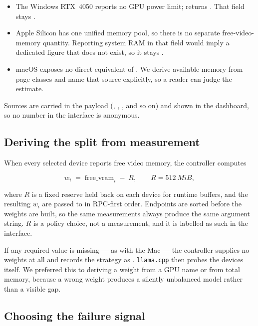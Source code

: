 \begin{itemize}[leftmargin=1.4em,itemsep=2pt]
  \item The Windows RTX~4050 reports no GPU power limit; 
        returns \code{[N/A]}. That field stays .
  \item Apple Silicon has one unified memory pool, so there is no separate
        free-video-memory quantity. Reporting system RAM in that field would
        imply a dedicated figure that does not exist, so it stays .
  \item macOS exposes no direct equivalent of . We derive
        available memory from  page classes and name that source
        explicitly, so a reader can judge the estimate.
\end{itemize}

Sources are carried in the payload (, ,
, and so on) and shown in the dashboard, so no
number in the interface is anonymous.

\subsection{Deriving the split from measurement}

When every selected device reports free video memory, the controller computes

\[
w_i \;=\; \mathrm{free\_vram}_i \;-\; R, \qquad R = \SI{512}{MiB},
\]

where $R$ is a fixed reserve held back on each device for runtime buffers, and
the resulting $w_i$ are passed to  in RPC-first order.
Endpoints are sorted before the weights are built, so the same measurements
always produce the same argument string. $R$ is a policy choice, not a
measurement, and it is labelled as such in the interface.

If any required value is missing --- as with the Mac --- the controller supplies
no weights at all and records the strategy as
. \texttt{llama.cpp} then
probes the devices itself. We preferred this to deriving a weight from a GPU
name or from total memory, because a wrong weight produces a silently
unbalanced model rather than a visible gap.

\subsection{Choosing the failure signal}

